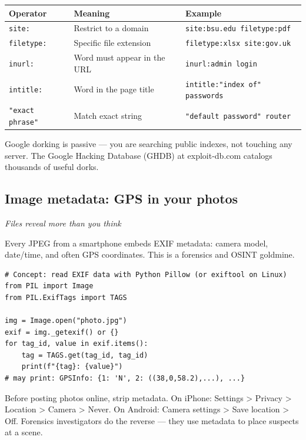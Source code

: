 \documentclass[12pt,openany]{book}
\begin{document}
\begin{center}\small\begin{tabular}{p{4.3cm}p{4.3cm}p{4.3cm}}\toprule
\textbf{Operator} & \textbf{Meaning} & \textbf{Example} \\ \midrule
\texttt{site:} & Restrict to a domain & \texttt{site:bsu.edu filetype:pdf} \\
\texttt{filetype:} & Specific file extension & \texttt{filetype:xlsx site:gov.uk} \\
\texttt{inurl:} & Word must appear in the URL & \texttt{inurl:admin login} \\
\texttt{intitle:} & Word in the page title & \texttt{intitle:"index of" passwords} \\
\texttt{"exact phrase"} & Match exact string & \texttt{"default password" router} \\
\bottomrule\end{tabular}\end{center}


Google dorking is passive --- you are searching public indexes, not touching any server. The Google Hacking Database (GHDB) at exploit-db.com catalogs thousands of useful dorks.

\medskip

\subsection*{Image metadata: GPS in your photos}
{\small\itshape\color{gray}Files reveal more than you think}

Every JPEG from a smartphone embeds EXIF metadata: camera model, date/time, and often GPS coordinates. This is a forensics and OSINT goldmine.


\begin{lstlisting}
# Concept: read EXIF data with Python Pillow (or exiftool on Linux)
from PIL import Image
from PIL.ExifTags import TAGS

img = Image.open("photo.jpg")
exif = img._getexif() or {}
for tag_id, value in exif.items():
    tag = TAGS.get(tag_id, tag_id)
    print(f"{tag}: {value}")
# may print: GPSInfo: {1: 'N', 2: ((38,0,58.2),...), ...}\end{lstlisting}


Before posting photos online, strip metadata. On iPhone: Settings \textgreater{} Privacy \textgreater{} Location \textgreater{} Camera \textgreater{} Never. On Android: Camera settings \textgreater{} Save location \textgreater{} Off. Forensics investigators do the reverse --- they use metadata to place suspects at a scene.
\end{document}
